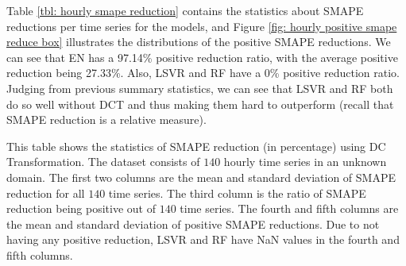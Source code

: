 Table \ref{tbl: hourly smape reduction} contains the statistics about SMAPE reductions per time series for the models, and Figure \ref{fig: hourly positive smape reduce box} illustrates the distributions of the positive SMAPE reductions. We can see that EN has a 97.14\% positive reduction ratio, with the average positive reduction being 27.33\%. Also, LSVR and RF have a 0\% positive reduction ratio. Judging from previous summary statistics, we can see that LSVR and RF both do so well without DCT and thus making them hard to outperform (recall that SMAPE reduction is a relative measure).
\begin{table}[H]
    \caption{Statistics of SMAPE reduction (\%) using DCT (hourly unknown domain)}
    {\raggedright \footnotesize This table shows the statistics of SMAPE reduction (in percentage) using DC Transformation. The dataset consists of $140$ hourly time series in an unknown domain. The first two columns are the mean and standard deviation of SMAPE reduction for all $140$ time series. The third column is the ratio of SMAPE reduction being positive out of $140$ time series. The fourth and fifth columns are the mean and standard deviation of positive SMAPE reductions. Due to not having any positive reduction, LSVR and RF have NaN values in the fourth and fifth columns. \par}
    \label{tbl: hourly smape reduction}
\end{table}
